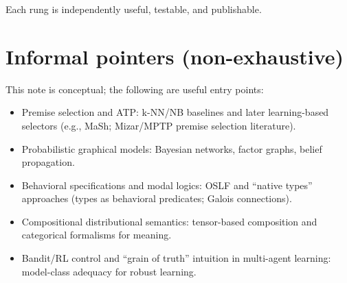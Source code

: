 \documentclass[11pt]{article}
\begin{document}
Each rung is independently useful, testable, and publishable.

\section{Informal pointers (non-exhaustive)}

This note is conceptual; the following are useful entry points:
\begin{itemize}[leftmargin=2em]
\item Premise selection and ATP: k-NN/NB baselines and later learning-based selectors (e.g., MaSh; Mizar/MPTP premise selection literature).
\item Probabilistic graphical models: Bayesian networks, factor graphs, belief propagation.
\item Behavioral specifications and modal logics: OSLF and ``native types'' approaches (types as behavioral predicates; Galois connections).
\item Compositional distributional semantics: tensor-based composition and categorical formalisms for meaning.
\item Bandit/RL control and ``grain of truth'' intuition in multi-agent learning: model-class adequacy for robust learning.
\end{itemize}
\end{document}
